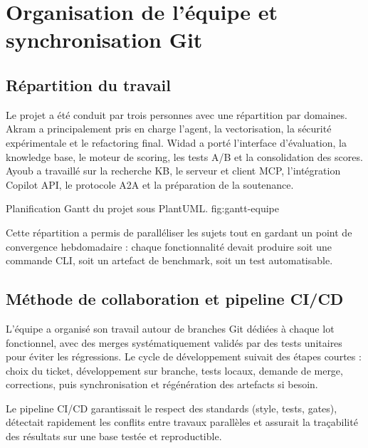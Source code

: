 
\chapter{Organisation de l'équipe et synchronisation Git}

\section{Répartition du travail}

Le projet a été conduit par trois personnes avec une répartition par domaines.
Akram a principalement pris en charge l'agent, la vectorisation, la sécurité
expérimentale et le refactoring final. Widad a porté l'interface d'évaluation,
la knowledge base, le moteur de scoring, les tests A/B et la consolidation des
scores. Ayoub a travaillé sur la recherche KB, le serveur et client MCP,
l'intégration Copilot API, le protocole A2A et la préparation de la soutenance.

{Planification Gantt du projet sous PlantUML.}
{fig:gantt-equipe}

Cette répartition a permis de paralléliser les sujets tout en gardant un point
de convergence hebdomadaire : chaque fonctionnalité devait produire soit une
commande CLI, soit un artefact de benchmark, soit un test automatisable.


\section{Méthode de collaboration et pipeline CI/CD}

L'équipe a organisé son travail autour de branches Git dédiées à chaque lot fonctionnel, avec des merges systématiquement validés par des tests unitaires pour éviter les régressions. Le cycle de développement suivait des étapes courtes : choix du ticket, développement sur branche, tests locaux, demande de merge, corrections, puis synchronisation et régénération des artefacts si besoin.

Le pipeline CI/CD garantissait le respect des standards (style, tests, gates), détectait rapidement les conflits entre travaux parallèles et assurait la traçabilité des résultats sur une base testée et reproductible.

